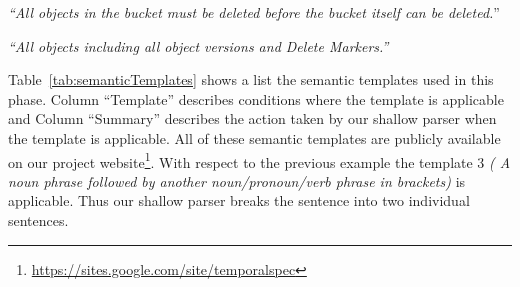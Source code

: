 \begin{center}
\scriptsize \textit{``All objects in the bucket must be deleted before the bucket itself can be deleted.}''
	
\textit{``All objects including all object versions and Delete Markers.''}\normalsize 
\end{center} 


Table~\ref{tab:semanticTemplates} shows a list the semantic templates used in this phase.
Column ``Template'' describes conditions where the template is applicable and Column ``Summary'' describes the action taken by our shallow parser when the template is applicable.
All of these semantic templates are publicly available on our project website\footnote{\url{https://sites.google.com/site/temporalspec}}.
With respect to the previous example the template 3 \textit{( A noun phrase followed by another noun/pronoun/verb phrase in brackets)} is applicable.
Thus our shallow parser breaks the sentence into two individual sentences.
	 

